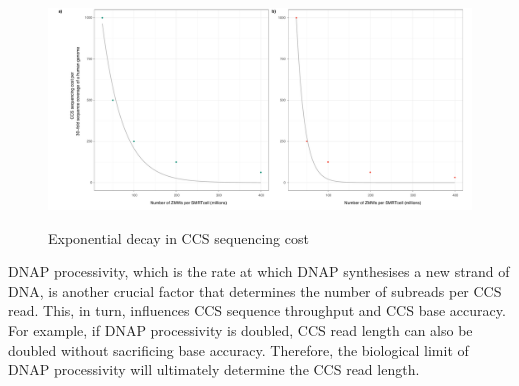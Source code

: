 \begin{figure}[h]
\caption{Exponential decay in CCS sequencing cost}\label{figure:ccs_sequence_throughput}
\begin{centering}
\includegraphics[width=\textwidth]{exponential_decay_in_ccs_sequencing_cost.pdf} \\ \smallskip
\end{centering}
\end{figure}


DNAP processivity, which is the rate at which DNAP synthesises a new strand of DNA, is another crucial factor that determines the number of subreads per CCS read. This, in turn, influences CCS sequence throughput and CCS base accuracy. For example, if DNAP processivity is doubled, CCS read length can also be doubled without sacrificing base accuracy. Therefore, the biological limit of DNAP processivity will ultimately determine the CCS read length. 

